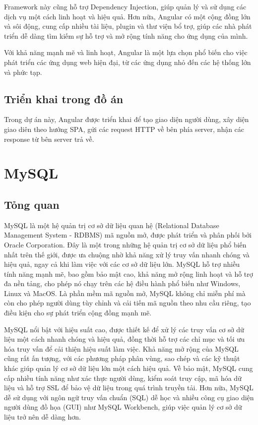 \documentclass[../DoAn.tex]{subfiles}
\begin{document}
Framework này cũng hỗ trợ Dependency Injection, giúp quản lý và sử dụng các dịch vụ một cách linh hoạt và hiệu quả. Hơn nữa, Angular có một cộng đồng lớn và sôi động, cung cấp nhiều tài liệu, plugin và thư viện bổ trợ, giúp các nhà phát triển dễ dàng tìm kiếm sự hỗ trợ và mở rộng tính năng cho ứng dụng của mình.

Với khả năng mạnh mẽ và linh hoạt, Angular là một lựa chọn phổ biến cho việc phát triển các ứng dụng web hiện đại, từ các ứng dụng nhỏ đến các hệ thống lớn và phức tạp.

\subsection{Triển khai trong đồ án}
\label{subsection:3.2.2}
Trong dự án này, Angular được triển khai để tạo giao diện người dùng, xây diện giao diên theo hướng SPA, gửi các request HTTP về bên phía server, nhận các response từ bên server trả về.

\section{MySQL}
\label{section:3.3}
\subsection{Tỏng quan}
\label{subsection:3.3.1}
MySQL là một hệ quản trị cơ sở dữ liệu quan hệ (Relational Database Management System - RDBMS) mã nguồn mở, được phát triển và phân phối bởi Oracle Corporation. Đây là một trong những hệ quản trị cơ sở dữ liệu phổ biến nhất trên thế giới, được ưa chuộng nhờ khả năng xử lý truy vấn nhanh chóng và hiệu quả, ngay cả khi làm việc với các cơ sở dữ liệu lớn. MySQL hỗ trợ nhiều tính năng mạnh mẽ, bao gồm bảo mật cao, khả năng mở rộng linh hoạt và hỗ trợ đa nền tảng, cho phép nó chạy trên các hệ điều hành phổ biến như Windows, Linux và MacOS. Là phần mềm mã nguồn mở, MySQL không chỉ miễn phí mà còn cho phép người dùng tùy chỉnh và cải tiến mã nguồn theo nhu cầu riêng, tạo điều kiện cho sự phát triển cộng đồng mạnh mẽ.

MySQL nổi bật với hiệu suất cao, được thiết kế để xử lý các truy vấn cơ sở dữ liệu một cách nhanh chóng và hiệu quả, đồng thời hỗ trợ các chỉ mục và tối ưu hóa truy vấn để cải thiện hiệu suất làm việc. Khả năng mở rộng của MySQL cũng rất ấn tượng, với các phương pháp phân vùng, sao chép và các kỹ thuật khác giúp quản lý cơ sở dữ liệu lớn một cách hiệu quả. Về bảo mật, MySQL cung cấp nhiều tính năng như xác thực người dùng, kiểm soát truy cập, mã hóa dữ liệu và hỗ trợ SSL để bảo vệ dữ liệu trong quá trình truyền tải. Hơn nữa, MySQL dễ sử dụng với ngôn ngữ truy vấn chuẩn (SQL) dễ học và nhiều công cụ giao diện người dùng đồ họa (GUI) như MySQL Workbench, giúp việc quản lý cơ sở dữ liệu trở nên dễ dàng hơn.
\end{document}
